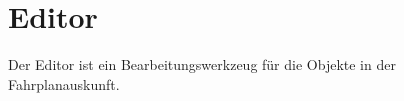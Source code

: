 \part{Editor}
\label{fahrplanauskunft_ui_windowsforms_editor}

Der Editor ist ein Bearbeitungswerkzeug für die Objekte in der Fahrplanauskunft.